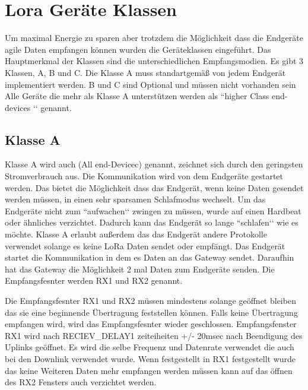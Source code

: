 \documentclass[a4paper,12pt]{article}
\begin{document}
    \section{Lora Geräte Klassen} \label{sec:klassen}
        Um maximal Energie zu sparen aber trotzdem die Möglichkeit dass die Endgeräte agile Daten empfangen können 
        wurden die Geräteklassen eingeführt. Das Hauptmerkmal der Klassen sind die unterschiedlichen Empfangsmodien. 
        Es gibt 3 Klassen, A, B und C. Die Klasse A muss standartgemäß von jedem Endgerät implementiert werden. B 
        und C sind Optional und müssen nicht vorhanden sein Alle Geräte die mehr als Klasse A unterstützen werden 
        als ``higher Class end-devices ‘‘ genannt. \cite[S.10]{LoRaSpec}
        \subsection{Klasse A}\label{sec:ClassA}
            Klasse A wird auch (All end-Devicec) genannt, zeichnet sich durch den geringsten Stromverbrauch aus. Die 
            Kommunikation wird von dem Endgeräte gestartet werden. Das bietet die Möglichkeit dass das Endgerät, wenn 
            keine Daten gesendet werden müssen, in einen sehr sparsamen Schlafmodus wechselt. Um das Endgeräte nicht 
            zum ``aufwachen‘‘ zwingen zu müssen, wurde auf einen Hardbeat oder ähnliches verzichtet. Dadurch kann das 
            Endgerät so lange ``schlafen‘‘ wie es möchte. Klasse A erlaubt außerdem das das Endgerät andere Protokolle 
            verwendet solange es keine LoRa Daten sendet oder empfängt. \cite[S.11 ff.]{LoRaSpec} Das Endgerät startet 
            die Kommunikation in dem es Daten an das Gateway sendet. Daraufhin hat das Gateway die Möglichkeit 2 mal 
            Daten zum Endgeräte senden. Die Empfangsfesnter werden RX1 und RX2 genannt. 

            Die Empfangsfesnter RX1 und RX2 müssen mindestens solange geöffnet bleiben das sie eine beginnende 
            Übertragung feststellen können. Falls keine Übertragung empfangen wird, wird das Empfangsfesnter wieder 
            geschlossen. Empfangsfenster RX1 wird nach RECIEV\_DELAY1 zeiteiheiten +/- 20msec nach Beendigung des 
            Uplinks geöffnet. Es wird die selbe Frequenz und Datenrate verwendet die auch bei den Downlink verwendet 
            wurde. Wenn festgestellt in RX1 festgestellt wurde das keine Weiteren Daten mehr empfangen werden müssen 
            kann auf das öffnen des RX2 Fensters auch verzichtet werden.
\end{document}
